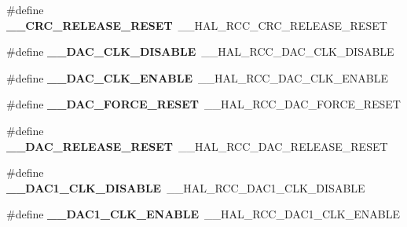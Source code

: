 \begin{DoxyCompactItemize}
\item 
\#define {\bfseries \+\_\+\+\_\+\+C\+R\+C\+\_\+\+R\+E\+L\+E\+A\+S\+E\+\_\+\+R\+E\+S\+ET}~\+\_\+\+\_\+\+H\+A\+L\+\_\+\+R\+C\+C\+\_\+\+C\+R\+C\+\_\+\+R\+E\+L\+E\+A\+S\+E\+\_\+\+R\+E\+S\+ET\hypertarget{group___h_a_l___r_c_c___aliased_gaa29b35e6b9f42b156e326efbb353b8f2}{}\label{group___h_a_l___r_c_c___aliased_gaa29b35e6b9f42b156e326efbb353b8f2}

\item 
\#define {\bfseries \+\_\+\+\_\+\+D\+A\+C\+\_\+\+C\+L\+K\+\_\+\+D\+I\+S\+A\+B\+LE}~\+\_\+\+\_\+\+H\+A\+L\+\_\+\+R\+C\+C\+\_\+\+D\+A\+C\+\_\+\+C\+L\+K\+\_\+\+D\+I\+S\+A\+B\+LE\hypertarget{group___h_a_l___r_c_c___aliased_ga8c9160056752d1daf7a39b2e4560eb9d}{}\label{group___h_a_l___r_c_c___aliased_ga8c9160056752d1daf7a39b2e4560eb9d}

\item 
\#define {\bfseries \+\_\+\+\_\+\+D\+A\+C\+\_\+\+C\+L\+K\+\_\+\+E\+N\+A\+B\+LE}~\+\_\+\+\_\+\+H\+A\+L\+\_\+\+R\+C\+C\+\_\+\+D\+A\+C\+\_\+\+C\+L\+K\+\_\+\+E\+N\+A\+B\+LE\hypertarget{group___h_a_l___r_c_c___aliased_ga702a2f0ecb75be8f6b277f0b344f92de}{}\label{group___h_a_l___r_c_c___aliased_ga702a2f0ecb75be8f6b277f0b344f92de}

\item 
\#define {\bfseries \+\_\+\+\_\+\+D\+A\+C\+\_\+\+F\+O\+R\+C\+E\+\_\+\+R\+E\+S\+ET}~\+\_\+\+\_\+\+H\+A\+L\+\_\+\+R\+C\+C\+\_\+\+D\+A\+C\+\_\+\+F\+O\+R\+C\+E\+\_\+\+R\+E\+S\+ET\hypertarget{group___h_a_l___r_c_c___aliased_ga3ad903bd351d3f99ebbc3a9cadec68e2}{}\label{group___h_a_l___r_c_c___aliased_ga3ad903bd351d3f99ebbc3a9cadec68e2}

\item 
\#define {\bfseries \+\_\+\+\_\+\+D\+A\+C\+\_\+\+R\+E\+L\+E\+A\+S\+E\+\_\+\+R\+E\+S\+ET}~\+\_\+\+\_\+\+H\+A\+L\+\_\+\+R\+C\+C\+\_\+\+D\+A\+C\+\_\+\+R\+E\+L\+E\+A\+S\+E\+\_\+\+R\+E\+S\+ET\hypertarget{group___h_a_l___r_c_c___aliased_ga27ea810f1968458f867faa45bb70bbe7}{}\label{group___h_a_l___r_c_c___aliased_ga27ea810f1968458f867faa45bb70bbe7}

\item 
\#define {\bfseries \+\_\+\+\_\+\+D\+A\+C1\+\_\+\+C\+L\+K\+\_\+\+D\+I\+S\+A\+B\+LE}~\+\_\+\+\_\+\+H\+A\+L\+\_\+\+R\+C\+C\+\_\+\+D\+A\+C1\+\_\+\+C\+L\+K\+\_\+\+D\+I\+S\+A\+B\+LE\hypertarget{group___h_a_l___r_c_c___aliased_ga7c25ff5fcaf15c3c3667584c18c4b8b7}{}\label{group___h_a_l___r_c_c___aliased_ga7c25ff5fcaf15c3c3667584c18c4b8b7}

\item 
\#define {\bfseries \+\_\+\+\_\+\+D\+A\+C1\+\_\+\+C\+L\+K\+\_\+\+E\+N\+A\+B\+LE}~\+\_\+\+\_\+\+H\+A\+L\+\_\+\+R\+C\+C\+\_\+\+D\+A\+C1\+\_\+\+C\+L\+K\+\_\+\+E\+N\+A\+B\+LE\hypertarget{group___h_a_l___r_c_c___aliased_gabd1fb5dfac0255c80e1a18dc3a536006}{}\label{group___h_a_l___r_c_c___aliased_gabd1fb5dfac0255c80e1a18dc3a536006}


\end{DoxyCompactItemize}
